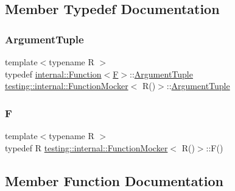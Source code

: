 \subsection{Member Typedef Documentation}
\mbox{\label{classtesting_1_1internal_1_1_function_mocker_3_01_r_07_08_4_a5a279e0d8414bf0809405c06a0725b66}} 
\subsubsection{\texorpdfstring{ArgumentTuple}{ArgumentTuple}}
{\footnotesize\ttfamily template$<$typename R $>$ \\
typedef \mbox{\hyperlink{structtesting_1_1internal_1_1_function}{internal\+::\+Function}}$<$\mbox{\hyperlink{classtesting_1_1internal_1_1_function_mocker_3_01_r_07_08_4_a2c1d7da413176d87405227df90a95521}{F}}$>$\+::\mbox{\hyperlink{classtesting_1_1internal_1_1_function_mocker_3_01_r_07_08_4_a5a279e0d8414bf0809405c06a0725b66}{Argument\+Tuple}} \mbox{\hyperlink{classtesting_1_1internal_1_1_function_mocker}{testing\+::internal\+::\+Function\+Mocker}}$<$ R()$>$\+::\mbox{\hyperlink{classtesting_1_1internal_1_1_function_mocker_3_01_r_07_08_4_a5a279e0d8414bf0809405c06a0725b66}{Argument\+Tuple}}}

\mbox{\label{classtesting_1_1internal_1_1_function_mocker_3_01_r_07_08_4_a2c1d7da413176d87405227df90a95521}} 
\subsubsection{\texorpdfstring{F}{F}}
{\footnotesize\ttfamily template$<$typename R $>$ \\
typedef R \mbox{\hyperlink{classtesting_1_1internal_1_1_function_mocker}{testing\+::internal\+::\+Function\+Mocker}}$<$ R()$>$\+::F()}



\subsection{Member Function Documentation}
\mbox{\label{classtesting_1_1internal_1_1_function_mocker_3_01_r_07_08_4_a8096a10aea2ffc6a78d0437855d2ef10}} 
